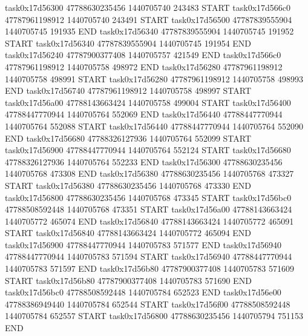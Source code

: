task0x17d56300 47788630235456          1440705740               243483  START
task0x17d566c0 47787961198912          1440705740               243491  START
task0x17d56500 47787839555904          1440705745               191935  END
task0x17d56340 47787839555904          1440705745               191952  START
task0x17d56340 47787839555904          1440705745               191954  END
task0x17d56240 47787900377408          1440705757               421549  END
task0x17d566c0 47787961198912          1440705758               498972  END
task0x17d56280 47787961198912          1440705758               498991  START
task0x17d56280 47787961198912          1440705758               498993  END
task0x17d56740 47787961198912          1440705758               498997  START
task0x17d56a00 47788143663424          1440705758               499004  START
task0x17d56400 47788447770944          1440705764               552069  END
task0x17d56440 47788447770944          1440705764               552088  START
task0x17d56440 47788447770944          1440705764               552090  END
task0x17d56680 47788326127936          1440705764               552099  START
task0x17d56900 47788447770944          1440705764               552124  START
task0x17d56680 47788326127936          1440705764               552233  END
task0x17d56300 47788630235456          1440705768               473308  END
task0x17d56380 47788630235456          1440705768               473327  START
task0x17d56380 47788630235456          1440705768               473330  END
task0x17d56800 47788630235456          1440705768               473345  START
task0x17d56bc0 47788508592448          1440705768               473351  START
task0x17d56a00 47788143663424          1440705772               465074  END
task0x17d56840 47788143663424          1440705772               465091  START
task0x17d56840 47788143663424          1440705772               465094  END
task0x17d56900 47788447770944          1440705783               571577  END
task0x17d56940 47788447770944          1440705783               571594  START
task0x17d56940 47788447770944          1440705783               571597  END
task0x17d56b80 47787900377408          1440705783               571609  START
task0x17d56b80 47787900377408          1440705783               571690  END
task0x17d56bc0 47788508592448          1440705784               652523  END
task0x17d56e00 47788386949440          1440705784               652544  START
task0x17d56f00 47788508592448          1440705784               652557  START
task0x17d56800 47788630235456          1440705794               751153  END
